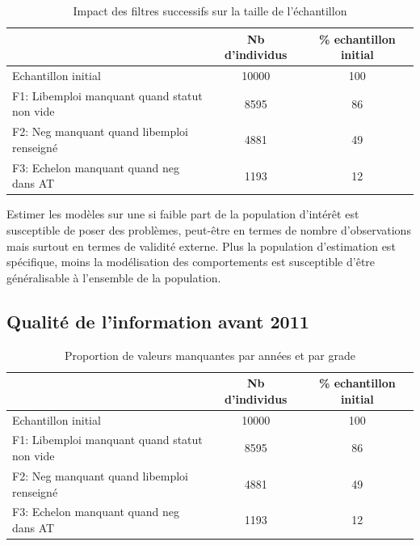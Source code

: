\documentclass[11pt,a4paper]{article}
\begin{document}
\begin{table}[h!]
\centering
\caption{Impact des filtres successifs sur la taille de l'échantillon} 
\label{filters}
\begin{tabular}{lcc}
\toprule
 & Nb d'individus & \% echantillon initial \\ 
  \hline
Echantillon initial & 10000 & 100 \\ 
F1: Libemploi manquant quand statut non vide & 8595 & 86 \\ 
F2: Neg manquant quand libemploi renseigné & 4881 & 49 \\ 
F3: Echelon manquant quand neg dans AT & 1193 & 12 \\ 
\bottomrule
\end{tabular}
\end{table}


Estimer les modèles sur une si faible part de la population d'intérêt est susceptible de poser des problèmes, peut-être en termes de nombre d'observations mais surtout en termes de validité externe. Plus la population d'estimation est spécifique, moins la modélisation des comportements est susceptible d'être généralisable à l'ensemble de la population. 




\subsection{Qualité de l'information avant 2011}


\begin{table}[h!]
\centering
\caption{Proportion de valeurs manquantes par années et par grade} 
\label{filters}
\begin{tabular}{lcc}
\toprule
 & Nb d'individus & \% echantillon initial \\ 
  \hline
Echantillon initial & 10000 & 100 \\ 
F1: Libemploi manquant quand statut non vide & 8595 & 86 \\ 
F2: Neg manquant quand libemploi renseigné & 4881 & 49 \\ 
F3: Echelon manquant quand neg dans AT & 1193 & 12 \\ 
\bottomrule
\end{tabular}
\end{table}
\end{document}
